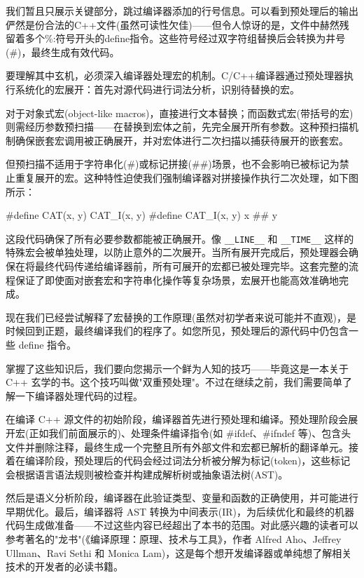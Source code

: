 我们暂且只展示关键部分，跳过编译器添加的行号信息。可以看到预处理后的输出俨然是份合法的C++文件(虽然可读性欠佳)——但令人惊讶的是，文件中赫然残留着多个\%:符号开头的define指令。这些符号经过双字符组替换后会转换为井号(\#)，最终生成有效代码。

要理解其中玄机，必须深入编译器处理宏的机制。C/C++编译器通过预处理器执行系统化的宏展开：首先对源代码进行词法分析，识别待替换的宏。

对于对象式宏(object-like macros)，直接进行文本替换；而函数式宏(带括号的宏)则需经历参数预扫描——在替换到宏体之前，先完全展开所有参数。这种预扫描机制确保嵌套宏调用被正确展开，并对宏体进行二次扫描以捕获待展开的嵌套宏。

但预扫描不适用于字符串化(\#)或标记拼接(\#\#)场景，也不会影响已被标记为禁止重复展开的宏。这种特性迫使我们强制编译器对拼接操作执行二次处理，如下图所示：

\begin{cpp}
#define CAT(x, y) CAT_I(x, y)
#define CAT_I(x, y) x ## y
\end{cpp}

这段代码确保了所有必要参数都能被正确展开。像 \verb|__LINE__| 和 \verb|__TIME__| 这样的特殊宏会被单独处理，以防止意外的二次展开。当所有展开完成后，预处理器会确保在将最终代码传递给编译器前，所有可展开的宏都已被处理完毕。这套完整的流程保证了即使面对嵌套宏和字符串化操作等复杂场景，宏展开也能高效准确地完成。

现在我们已经尝试解释了宏替换的工作原理(虽然对初学者来说可能并不直观)，是时候回到正题，最终编译我们的程序了。如您所见，预处理后的源代码中仍包含一些 define 指令。

掌握了这些知识后，我们要向您揭示一个鲜为人知的技巧——毕竟这是一本关于 C++ 玄学的书。这个技巧叫做"双重预处理"。不过在继续之前，我们需要简单了解一下编译器处理代码的过程。

在编译 C++ 源文件的初始阶段，编译器首先进行预处理和编译。预处理阶段会展开宏(正如我们前面展示的)、处理条件编译指令(如 \#ifdef、\#ifndef 等)、包含头文件并删除注释，最终生成一个完整且所有外部文件和宏都已解析的翻译单元。接着在编译阶段，预处理后的代码会经过词法分析被分解为标记(token)，这些标记会根据语言语法规则被检查并构建成解析树或抽象语法树(AST)。

然后是语义分析阶段，编译器在此验证类型、变量和函数的正确使用，并可能进行早期优化。最后，编译器将 AST 转换为中间表示(IR)，为后续优化和最终的机器代码生成做准备——不过这些内容已经超出了本书的范围。对此感兴趣的读者可以参考著名的"龙书"(《编译原理：原理、技术与工具》，作者 Alfred Aho、Jeffrey Ullman、Ravi Sethi 和 Monica Lam)，这是每个想开发编译器或单纯想了解相关技术的开发者的必读书籍。

